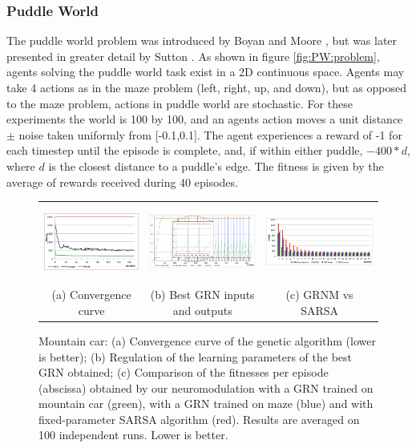 
\subsubsection{Puddle World}

The puddle world problem was introduced by Boyan and Moore \cite{Boyan1995}, but was later presented in greater detail by Sutton \cite{sutton1996generalization}. As shown in figure \ref{fig:PW:problem}, agents solving the puddle world task exist in a 2D continuous space. Agents may take 4 actions as in the maze problem (left, right, up, and down), but as opposed to the maze problem, actions in puddle world are stochastic. For these experiments the world is 100 by 100, and an agents action moves a unit distance $\pm$ noise taken uniformly from [-0.1,0.1]. The agent experiences a reward of -1 for each timestep until the episode is complete, and, if within either puddle, $-400*d$, where $d$ is the closest distance to a puddle's edge. The fitness is given by the average of rewards received during 40 episodes.


\begin{figure}[t!]
\center
\begin{tabular}{ccc}
\includegraphics[height=2.5cm]{MC_convergence.pdf} &
\includegraphics[height=2.5cm]{MC_GRNBehavior.pdf} &
\includegraphics[height=2.5cm]{MC_GRNvsSARSA.pdf}\\
(a) Convergence curve &
(b) Best GRN inputs and outputs &
(c) GRNM vs SARSA
\end{tabular}
\caption{Mountain car: (a) Convergence curve of the genetic algorithm (lower is better); (b) Regulation of the learning parameters of the best GRN obtained; (c) Comparison of the fitnesses per episode (abscissa) obtained by our neuromodulation with a GRN trained on mountain car (green), with a GRN trained on maze (blue) and with fixed-parameter SARSA algorithm (red). Results are averaged on 100 independent runs. Lower is better.}\label{fig:MC:Results}
\end{figure}

